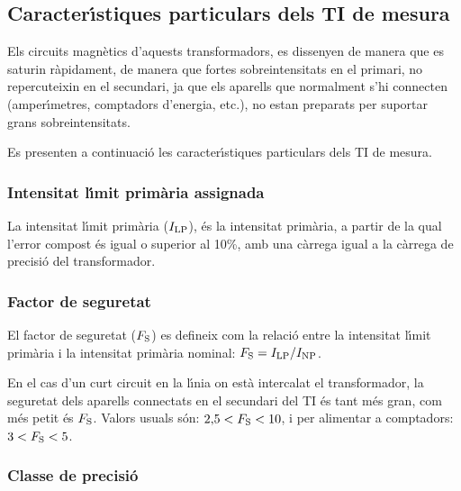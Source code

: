 \subsection{Caracter\'{\i}stiques particulars dels TI de mesura}

Els circuits magn\`{e}tics d'aquests transformadors, es dissenyen de
manera que es saturin r\`{a}pidament, de manera que fortes
sobreintensitats en el primari,  no repercuteixin en el secundari,
ja que els aparells que normalment s'hi connecten (amper\'{\i}metres,
comptadors d'energia, etc.), no estan preparats per suportar grans
sobreintensitats.

Es presenten a continuaci\'{o} les caracter\'{\i}stiques particulars dels TI
de mesura.

\subsubsection{Intensitat l\'{\i}mit prim\`{a}ria  assignada}

 La intensitat l\'{\i}mit prim\`{a}ria
($I_\mathrm{LP}$),
\'{e}s la intensitat prim\`{a}ria, a partir de la qual l'error compost \'{e}s igual
o superior al 10\unit{\%}, amb una c\`{a}rrega igual a la c\`{a}rrega de
precisi\'{o} del transformador.

\subsubsection{Factor de seguretat}

 El factor de seguretat
($F_\mathrm{S}$) es defineix com la relaci\'{o} entre la intensitat l\'{\i}mit prim\`{a}ria
i la intensitat prim\`{a}ria nominal: $F_\mathrm{S} = I_\mathrm{LP} / I_\mathrm{NP}$.

En el cas d'un curt circuit en la l\'{\i}nia on est\`{a} intercalat el
transformador, la seguretat dels aparells connectats en el secundari
del TI \'{e}s tant m\'{e}s gran, com m\'{e}s petit \'{e}s  $F_\mathrm{S}$. Valors usuals
s\'{o}n:  $2{,}5<F_\mathrm{S}<10$, i per alimentar a comptadors:
$3<F_\mathrm{S}<5$.

\subsubsection{Classe de precisi\'{o}}

